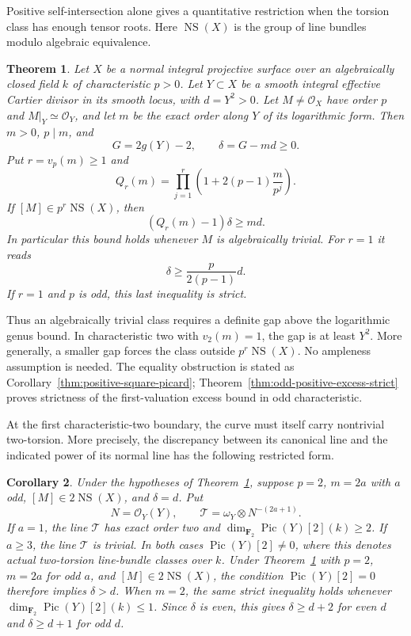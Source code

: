 \documentclass[11pt]{article}
\newtheorem{theorem}{Theorem}[section]
\newtheorem{corollary}[theorem]{Corollary}
\theoremstyle{remark}\newtheorem{remark}[theorem]{Remark}
\newcommand{\OO}{\mathcal O}
\newcommand{\F}{\mathbf F}
\newcommand{\Pic}{\operatorname{Pic}}
\begin{document}
Positive self-intersection alone gives a quantitative restriction when
the torsion class has enough tensor roots. Here $\operatorname{NS}(X)$
is the group of line bundles modulo algebraic equivalence.

\begin{theorem}\label{thm:positive-excess-picard}
Let $X$ be a normal integral projective surface over an algebraically
closed field $k$ of characteristic $p>0$. Let $Y\subset X$ be a smooth
integral effective Cartier divisor in its smooth locus, with $d=Y^2>0$.
Let $M\ne\OO_X$ have order $p$ and $M|_Y\simeq\OO_Y$, and let $m$
be the exact order along $Y$ of its logarithmic form. Then $m>0$,
$p\mid m$, and
\[
 G=2g(Y)-2,\qquad \delta=G-md\geq0.
\]
Put $r=v_p(m)\geq1$ and
\[
 Q_r(m)=\prod_{j=1}^{r}\left(1+2(p-1)\frac{m}{p^j}\right).
\]
If $[M]\in p^r\operatorname{NS}(X)$, then
\begin{equation}\label{eq:positive-excess-main-bound}
 (Q_r(m)-1)\delta\geq md.
\end{equation}
In particular this bound holds whenever $M$ is algebraically trivial.
For $r=1$ it reads
\[
 \delta\geq\frac{p}{2(p-1)}d.
\]
If $r=1$ and $p$ is odd, this last inequality is strict.
\end{theorem}

Thus an algebraically trivial class requires a definite gap above the
logarithmic genus bound. In characteristic two with $v_2(m)=1$, the
gap is at least $Y^2$. More generally, a smaller gap forces the class
outside $p^r\operatorname{NS}(X)$. No ampleness assumption is needed.
The equality obstruction is stated as
Corollary~\ref{thm:positive-square-picard};
Theorem~\ref{thm:odd-positive-excess-strict} proves strictness
of the first-valuation excess bound in odd characteristic.

At the first characteristic-two boundary, the curve must itself
carry nontrivial two-torsion. More precisely, the discrepancy
between its canonical line and the indicated power of its normal
line has the following restricted form.

\begin{corollary}\label{cor:positive-excess-characteristic-two-boundary}
Under the hypotheses of Theorem~\ref{thm:positive-excess-picard},
suppose $p=2$, $m=2a$ with $a$ odd, $[M]\in2\operatorname{NS}(X)$,
and $\delta=d$. Put
\[
 N=\OO_Y(Y),\qquad
 \mathcal T=\omega_Y\otimes N^{-(2a+1)}.
\]
If $a=1$, the line $\mathcal T$ has exact order two and
$\dim_{\F_2}\Pic(Y)[2](k)\geq2$.
If $a\geq3$, the line $\mathcal T$ is trivial.
In both cases $\Pic(Y)[2]\ne0$, where this denotes actual
two-torsion line-bundle classes over $k$.
Under Theorem~\ref{thm:positive-excess-picard} with $p=2$,
$m=2a$ for odd $a$, and $[M]\in2\operatorname{NS}(X)$,
the condition $\Pic(Y)[2]=0$ therefore implies $\delta>d$.
When $m=2$, the same strict inequality holds whenever
$\dim_{\F_2}\Pic(Y)[2](k)\leq1$.
Since $\delta$ is even, this gives
$\delta\geq d+2$ for even $d$ and $\delta\geq d+1$ for odd $d$.
\end{corollary}
\end{document}
